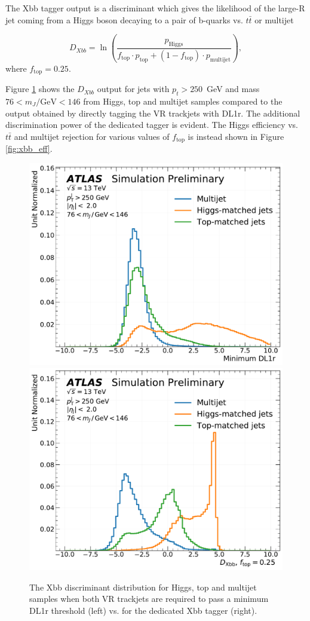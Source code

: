 \documentclass[10pt,a4paper]{book}
\begin{document}
The Xbb tagger output is a discriminant which gives the likelihood of the large-R jet coming from a Higgs boson decaying to a pair of b-quarks vs. $t\bar{t}$ or multijet

\begin{equation}
    D_{Xbb} = \ln \left( \frac{p_{\text{Higgs}}}{f_{\text{top}} \cdot p_{\text{top}} + (1 - f_{\text{top}}) \cdot p_{\text{multijet}}} \right)
    \label{eq:dxbb},
\end{equation}
where $f_\text{top} = 0.25$. 

Figure \ref{xbb discriminant} shows the $D_{Xbb}$ output for jets with $p_t > 250$~GeV and mass $76 < m_J/\text{GeV} < 146$ from Higgs, top and multijet samples compared to the output obtained by directly tagging the VR trackjets with DL1r. The additional discrimination power of the dedicated tagger is evident. The Higgs efficiency vs. $t\bar{t}$ and multijet rejection for various values of $f_{\text{top}}$ is instead shown in Figure \ref{fig:xbb_eff}.

\begin{figure}
\includegraphics[width=0.485\linewidth]{ftag/xbb_dl1.pdf}
\includegraphics[width=0.485\linewidth]{ftag/xbb.pdf}
\caption{The Xbb discriminant distribution for Higgs, top and multijet samples when both VR trackjets are required to pass a minimum DL1r threshold (left) vs. for the dedicated Xbb tagger (right)\cite{ATLAS:2020ixf}.}
\label{xbb discriminant}
\end{figure}
\end{document}

